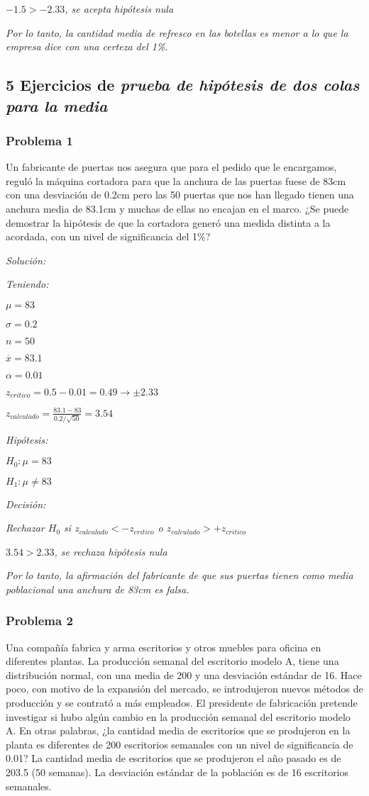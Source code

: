 \documentclass[a4paper, 12pt]{article}
\begin{document}
$-1.5>-2.33$\emph{, se acepta hipótesis nula}

\emph{Por lo tanto, la cantidad media de refresco en las botellas es menor a lo que la empresa dice con una certeza del 1\%.}

\subsection{5 Ejercicios de \emph{prueba de hipótesis de dos colas para la media}}

\subsubsection{Problema 1}
Un fabricante de puertas nos asegura que para el pedido que le encargamos, reguló la máquina cortadora para que la anchura de las puertas fuese de 83cm con una desviación de 0.2cm pero las 50 puertas que nos han llegado tienen una anchura media de 83.1cm y muchas de ellas no encajan en el marco. ¿Se puede demostrar la hipótesis de que la cortadora generó una medida distinta a la acordada, con un nivel de significancia del 1\%?

\emph{Solución:}

\emph{Teniendo:}

$\mu=83$

$\sigma=0.2$

$n=50$

$\overline{x}=83.1$

$\alpha=0.01$

$z_{critico}=0.5-0.01=0.49\to\pm 2.33$

$z_{calculado}=\frac{83.1-83}{0.2/\sqrt{50}}=3.54$

\emph{Hipótesis:}

$H_0:\mu=83$

$H_1:\mu\neq 83$

\emph{Decisión:}

\emph{Rechazar $H_0$ si $z_{calculado}<-z_{critico}$ o $z_{calculado}>+z_{critico}$}

$3.54>2.33$\emph{, se rechaza hipótesis nula}

\emph{Por lo tanto, la afirmación del fabricante de que sus puertas tienen como media poblacional una anchura de 83cm es falsa.}

\subsubsection{Problema 2}
Una compañía fabrica y arma escritorios y otros muebles para oficina en diferentes plantas. La producción semanal del escritorio modelo A, tiene una distribución normal, con una media de 200 y una desviación estándar de 16. Hace poco, con motivo de la expansión del mercado, se introdujeron nuevos métodos de producción y se contrató a más empleados. El presidente de fabricación pretende investigar si hubo algún cambio en la producción semanal del escritorio modelo A. En otras palabras, ¿la cantidad media de escritorios que se produjeron en la planta es diferentes de 200 escritorios semanales con un nivel de significancia de 0.01? La cantidad media de escritorios que se produjeron el año pasado es de 203.5 (50 semanas). La desviación estándar de la población es de 16 escritorios semanales.
\end{document}
